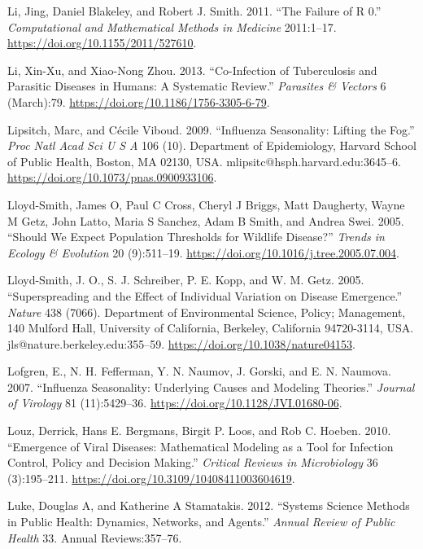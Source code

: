 \documentclass[]{book}
\theoremstyle{definition}
\theoremstyle{definition}
\theoremstyle{definition}
\theoremstyle{remark}
\begin{document}
\leavevmode\hypertarget{ref-li11}{}%
Li, Jing, Daniel Blakeley, and Robert J. Smith. 2011. ``The Failure of R
0.'' \emph{Computational and Mathematical Methods in Medicine}
2011:1--17. \url{https://doi.org/10.1155/2011/527610}.

\leavevmode\hypertarget{ref-li13}{}%
Li, Xin-Xu, and Xiao-Nong Zhou. 2013. ``Co-Infection of Tuberculosis and
Parasitic Diseases in Humans: A Systematic Review.'' \emph{Parasites \&
Vectors} 6 (March):79. \url{https://doi.org/10.1186/1756-3305-6-79}.

\leavevmode\hypertarget{ref-lipsitch09}{}%
Lipsitch, Marc, and Cécile Viboud. 2009. ``Influenza Seasonality:
Lifting the Fog.'' \emph{Proc Natl Acad Sci U S A} 106 (10). Department
of Epidemiology, Harvard School of Public Health, Boston, MA 02130, USA.
mlipsitc@hsph.harvard.edu:3645--6.
\url{https://doi.org/10.1073/pnas.0900933106}.

\leavevmode\hypertarget{ref-lloyd-smith05b}{}%
Lloyd-Smith, James O, Paul C Cross, Cheryl J Briggs, Matt Daugherty,
Wayne M Getz, John Latto, Maria S Sanchez, Adam B Smith, and Andrea
Swei. 2005. ``Should We Expect Population Thresholds for Wildlife
Disease?'' \emph{Trends in Ecology \& Evolution} 20 (9):511--19.
\url{https://doi.org/10.1016/j.tree.2005.07.004}.

\leavevmode\hypertarget{ref-lloyd-smith05}{}%
Lloyd-Smith, J. O., S. J. Schreiber, P. E. Kopp, and W. M. Getz. 2005.
``Superspreading and the Effect of Individual Variation on Disease
Emergence.'' \emph{Nature} 438 (7066). Department of Environmental
Science, Policy; Management, 140 Mulford Hall, University of California,
Berkeley, California 94720-3114, USA. jls@nature.berkeley.edu:355--59.
\url{https://doi.org/10.1038/nature04153}.

\leavevmode\hypertarget{ref-lofgren07}{}%
Lofgren, E., N. H. Fefferman, Y. N. Naumov, J. Gorski, and E. N.
Naumova. 2007. ``Influenza Seasonality: Underlying Causes and Modeling
Theories.'' \emph{Journal of Virology} 81 (11):5429--36.
\url{https://doi.org/10.1128/JVI.01680-06}.

\leavevmode\hypertarget{ref-louz10}{}%
Louz, Derrick, Hans E. Bergmans, Birgit P. Loos, and Rob C. Hoeben.
2010. ``Emergence of Viral Diseases: Mathematical Modeling as a Tool for
Infection Control, Policy and Decision Making.'' \emph{Critical Reviews
in Microbiology} 36 (3):195--211.
\url{https://doi.org/10.3109/10408411003604619}.

\leavevmode\hypertarget{ref-luke12}{}%
Luke, Douglas A, and Katherine A Stamatakis. 2012. ``Systems Science
Methods in Public Health: Dynamics, Networks, and Agents.'' \emph{Annual
Review of Public Health} 33. Annual Reviews:357--76.
\end{document}
